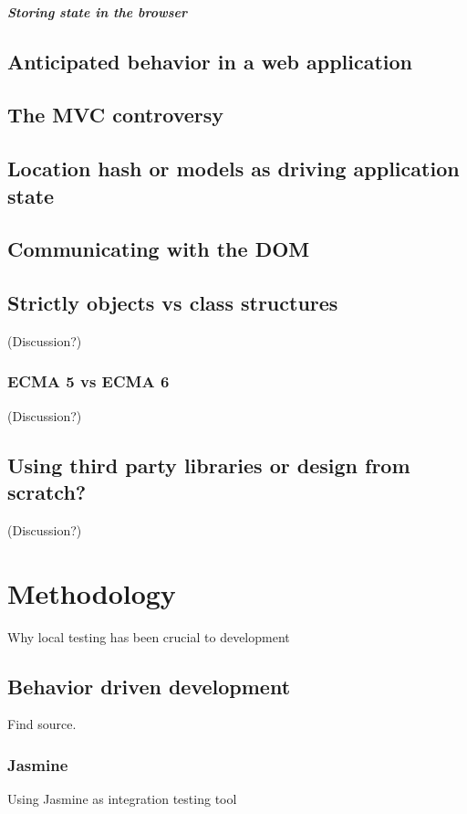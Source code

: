 \documentclass[english]{ifimaster}
\begin{document}
\paragraph{Storing state in the browser}

\section{Anticipated behavior in a web application}

\section{The MVC controversy}
\section{Location hash or models as driving application state}

\section{Communicating with the DOM}

\section{Strictly objects vs class structures} (Discussion?)
\subsection{ECMA 5 vs ECMA 6} (Discussion?)

\section{Using third party libraries or design from scratch?} (Discussion?)

\chapter{Methodology}
Why local testing has been crucial to development 

\section{Behavior driven development}
Find source.

\subsection{Jasmine}
Using Jasmine as integration testing tool
\end{document}
